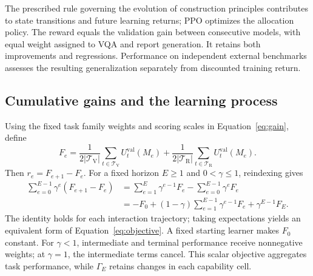 The prescribed rule governing the evolution of construction principles contributes to state transitions and future learning returns; PPO optimizes the allocation policy. The reward equals the validation gain between consecutive models, with equal weight assigned to VQA and report generation. It retains both improvements and regressions. Performance on independent external benchmarks assesses the resulting generalization separately from discounted training return.

\subsection{Cumulative gains and the learning process}
\label{app:cumulative_gains}

Using the fixed task family weights and scoring scales in Equation~\ref{eq:gain}, define
\[
F_e=\frac{1}{2|\mathcal T_{\mathrm V}|}\sum_{t\in\mathcal T_{\mathrm V}}U_t^{\mathrm{val}}(M_e)
+\frac{1}{2|\mathcal T_{\mathrm R}|}\sum_{t\in\mathcal T_{\mathrm R}}U_t^{\mathrm{val}}(M_e).
\]
Then $r_e=F_{e+1}-F_e$. For a fixed horizon $E\geq1$ and $0<\gamma\leq1$, reindexing gives
\begin{equation}
\begin{aligned}
\sum_{e=0}^{E-1}\gamma^e(F_{e+1}-F_e)
&=\sum_{e=1}^{E}\gamma^{e-1}F_e-\sum_{e=0}^{E-1}\gamma^eF_e\\
&=-F_0+(1-\gamma)\sum_{e=1}^{E-1}\gamma^{e-1}F_e+\gamma^{E-1}F_E.
\end{aligned}
\label{eq:trajectory_objective}
\end{equation}
The identity holds for each interaction trajectory; taking expectations yields an equivalent form of Equation~\ref{eq:objective}. A fixed starting learner makes $F_0$ constant. For $\gamma<1$, intermediate and terminal performance receive nonnegative weights; at $\gamma=1$, the intermediate terms cancel. This scalar objective aggregates task performance, while $\Gamma_E$ retains changes in each capability cell.


